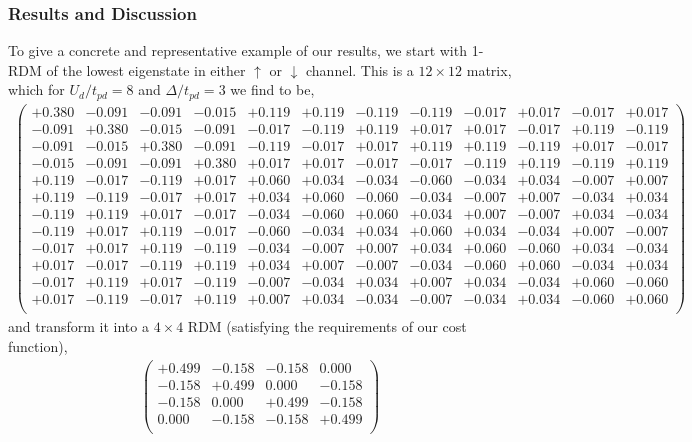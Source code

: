 \documentclass[prl,12pt,onecolumn,nofootinbib,notitlepage,english,superscriptaddress]{revtex4-1}
\begin{document}
\subsubsection{Results and Discussion}
To give a concrete and representative example of our results, we start with 1-RDM of the lowest eigenstate 
in either $\uparrow$ or $\downarrow$ channel. This is a $12 \times 12$ matrix, which for $U_{d}/t_{pd}=8$ 
and $\Delta/t_{pd}=3$ we find to be,
\begin{eqnarray}
\left(
\begin{array}{cccccccccccc}
+0.380	   & -0.091 &-0.091 &-0.015& +0.119& +0.119& -0.119 &-0.119 &-0.017 &+0.017 &-0.017 &+0.017 \\
-0.091	   & +0.380 &-0.015 &-0.091& -0.017& -0.119& +0.119 &+0.017 &+0.017 &-0.017 &+0.119 &-0.119 \\
-0.091	   & -0.015 &+0.380 &-0.091& -0.119& -0.017& +0.017 &+0.119 &+0.119 &-0.119 &+0.017 &-0.017 \\
-0.015	   & -0.091 &-0.091 &+0.380& +0.017& +0.017& -0.017 &-0.017 &-0.119 &+0.119 &-0.119 &+0.119 \\
+0.119	   & -0.017 &-0.119 &+0.017& +0.060& +0.034& -0.034 &-0.060 &-0.034 &+0.034 &-0.007 &+0.007 \\
+0.119	   & -0.119 &-0.017 &+0.017& +0.034& +0.060& -0.060 &-0.034 &-0.007 &+0.007 &-0.034 &+0.034 \\
-0.119	   & +0.119 &+0.017 &-0.017& -0.034& -0.060& +0.060 &+0.034 &+0.007 &-0.007 &+0.034 &-0.034 \\
-0.119	   & +0.017 &+0.119 &-0.017& -0.060& -0.034& +0.034 &+0.060 &+0.034 &-0.034 &+0.007 &-0.007 \\
-0.017	   & +0.017 &+0.119 &-0.119& -0.034& -0.007& +0.007 &+0.034 &+0.060 &-0.060 &+0.034 &-0.034 \\
+0.017	   & -0.017 &-0.119 &+0.119& +0.034& +0.007& -0.007 &-0.034 &-0.060 &+0.060 &-0.034 &+0.034 \\
-0.017	   & +0.119 &+0.017 &-0.119& -0.007& -0.034& +0.034 &+0.007 &+0.034 &-0.034 &+0.060 &-0.060 \\
+0.017	   & -0.119 &-0.017 &+0.119& +0.007& +0.034& -0.034 &-0.007 &-0.034 &+0.034 &-0.060 &+0.060 \\
\end{array}
\right)
\end{eqnarray}
and transform it into a $4\times4$ RDM (satisfying the requirements of our cost function), 
\begin{eqnarray}
\left(
\begin{array}{cccc}
+0.499 & -0.158 & -0.158 & 0.000  \\
-0.158 & +0.499 &  0.000 & -0.158 \\
-0.158 &  0.000 & +0.499 & -0.158 \\
 0.000 & -0.158 & -0.158 & +0.499 \\
\end{array}
\right)
\end{eqnarray}
\end{document}
